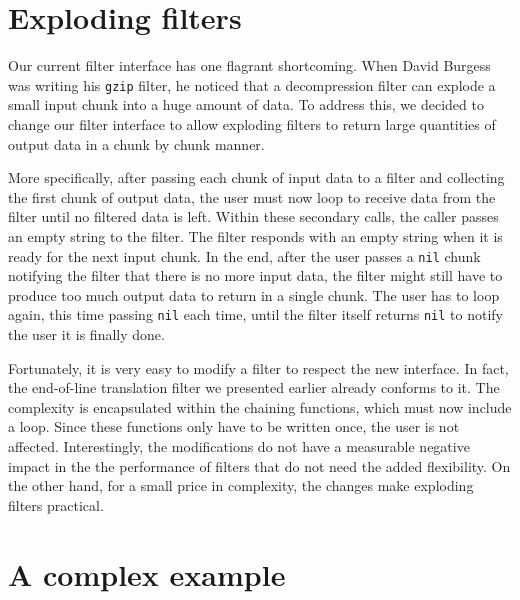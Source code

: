 \documentclass[10pt]{article}
\begin{document}
\section{Exploding filters}

Our current filter interface has one flagrant shortcoming.
When David Burgess was writing his \texttt{gzip} filter, he
noticed that a decompression filter can explode a small
input chunk into a huge amount of data. To address this, we
decided to change our filter interface to allow exploding
filters to return large quantities of output data in a chunk
by chunk manner. 

More specifically, after passing each chunk of input data to
a filter and collecting the first chunk of output data, the
user must now loop to receive data from the filter until no
filtered data is left. Within these secondary calls, the
caller passes an empty string to the filter. The filter
responds with an empty string when it is ready for the next
input chunk. In the end, after the user passes a
\texttt{nil} chunk notifying the filter that there is no
more input data, the filter might still have to produce too
much output data to return in a single chunk. The user has
to loop again, this time passing \texttt{nil} each time,
until the filter itself returns \texttt{nil} to notify the
user it is finally done.

Fortunately, it is very easy to modify a filter to respect
the new interface. In fact, the end-of-line translation
filter we presented earlier already conforms to it.  The
complexity is encapsulated within the chaining functions,
which must now include a loop. Since these functions only
have to be written once, the user is not affected.
Interestingly, the modifications do not have a measurable
negative impact in the the performance of filters that do
not need the added flexibility. On the other hand, for a
small price in complexity, the changes make exploding
filters practical. 

\section{A complex example}
\end{document}
